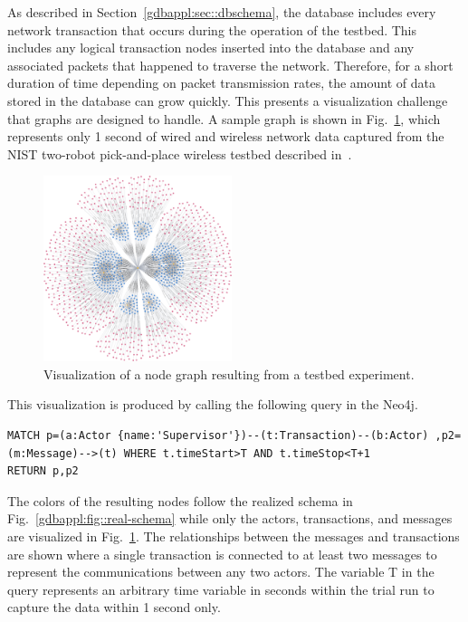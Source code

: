 As described in Section~\ref{gdbappl:sec::dbschema}, the database includes every network transaction that occurs during the operation of the testbed.  This includes any logical transaction nodes inserted into the database and any associated packets that happened to traverse the network.  Therefore, for a short duration of time depending on packet transmission rates, the amount of data stored in the database can grow quickly. This presents a visualization challenge that graphs are designed to handle. A sample graph is shown in Fig.~\ref{gdbappl:fig::Sample-graph_1}, which represents only 1 second of wired and wireless network data captured from the NIST two-robot pick-and-place wireless testbed described in~\cite{Liu2019vancouver}. 

\begin{figure}
    \centering
   \includegraphics[width=0.49\textwidth]{./chapter-gdb-appl/figures/database/graph_M_T_2.png}
   \vspace{0.1in}
    \caption{ Visualization of a node graph resulting from a testbed experiment. }
    \label{gdbappl:fig::Sample-graph_1}
    \vspace{0.1in}
\end{figure}

This visualization is produced by calling the following query in the Neo4j. 
\begin{lstlisting}
MATCH p=(a:Actor {name:'Supervisor'})--(t:Transaction)--(b:Actor) ,p2=(m:Message)-->(t) WHERE t.timeStart>T AND t.timeStop<T+1
RETURN p,p2
\end{lstlisting}

The colors of the resulting nodes follow the realized schema in Fig.~\ref{gdbappl:fig::real-schema} while only the actors, transactions, and messages are visualized in Fig.~\ref{gdbappl:fig::Sample-graph_1}. The relationships between the messages and transactions are shown where a single transaction is connected to at least two messages to represent the communications between any two actors. The variable T in the query represents an arbitrary time variable in seconds within the trial run to capture the data within 1 second only.


